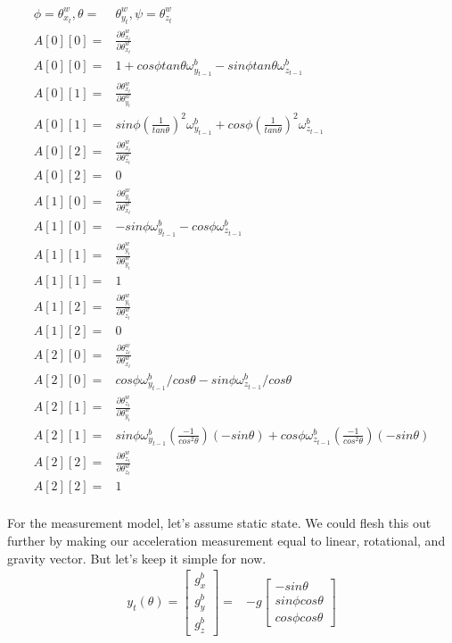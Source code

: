 \documentclass[conference]{IEEEtran}
\begin{document}
\begin{align*}
\phi =  \theta_{x_{t}}^{w}, \theta =&  \theta_{y_{t}}^{w}, \psi =  \theta_{z_{t}}^{w}\\
A[0][0] =& \frac{\partial \theta_{x_{t}}^{w}}{\partial \theta_{x_{t}}^{w}}\\
A[0][0] =& 1 + cos\phi tan\theta \omega_{y_{t-1}}^b - sin\phi tan\theta  \omega_{z_{t-1}}^b \\
A[0][1] =& \frac{\partial \theta_{x_{t}}^{w}}{\partial \theta_{y_{t}}^{w}}\\
A[0][1] =& sin\phi (\frac{1}{tan\theta})^2 \omega_{y_{t-1}}^b +  cos\phi (\frac{1}{tan\theta})^2  \omega_{z_{t-1}}^b \\
A[0][2] =& \frac{\partial \theta_{x_{t}}^{w}}{\partial \theta_{z_{t}}^{w}}\\
A[0][2] =& 0 \\
A[1][0] =& \frac{\partial \theta_{y_{t}}^{w}}{\partial \theta_{x_{t}}^{w}}\\
A[1][0] =& -sin\phi \omega_{y_{t-1}}^b -cos\phi \omega_{z_{t-1}}^b  \\
A[1][1] =& \frac{\partial \theta_{y_{t}}^{w}}{\partial \theta_{y_{t}}^{w}}\\
A[1][1] =& 1  \\
A[1][2] =& \frac{\partial \theta_{y_{t}}^{w}}{\partial \theta_{z_{t}}^{w}}\\
A[1][2] =& 0\\
A[2][0] =& \frac{\partial \theta_{z_{t}}^{w}}{\partial \theta_{x_{t}}^{w}}\\
A[2][0] =& cos\phi \omega_{y_{t-1}}^b / cos \theta - sin\phi \omega_{z_{t-1}}^b / cos\theta \\
A[2][1] =& \frac{\partial \theta_{z_{t}}^{w}}{\partial \theta_{y_{t}}^{w}}\\
A[2][1] =& sin\phi \omega_{y_{t-1}}^b (\frac{-1}{cos^2 \theta})(-sin\theta)  + cos\phi \omega_{z_{t-1}}^b (\frac{-1}{cos^2 \theta})(-sin\theta) \\
A[2][2] =& \frac{\partial \theta_{z_{t}}^{w}}{\partial \theta_{z_{t}}^{w}}\\
A[2][2] =& 1 \\
\end{align*}




For the measurement model, let's assume static state. We could flesh this out further by making our acceleration measurement equal to linear, rotational, and gravity vector. But let's keep it simple for now.
\begin{align}
y_t(\theta) = \begin{bmatrix} g_x^b \\  g_y^b \\  g_z^b \end{bmatrix} =& -g \begin{bmatrix} -sin \theta\\
													             sin \phi cos \theta \\
													              cos \phi cos \theta \end{bmatrix} \nonumber
\end{align}
\end{document}
